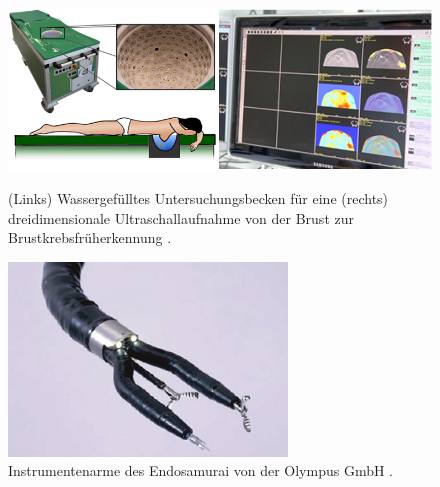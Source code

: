 

\begin{figure}[!htb]
		\includegraphics[width=\linewidth]{Content/Pictures/us.png}
		\caption{(Links) Wassergefülltes Untersuchungsbecken für eine (rechts) dreidimensionale Ultraschallaufnahme von der Brust zur Brustkrebsfrüherkennung \cite{Ultraschall}.} 
		\label{fig:us}
	\endminipage\hfill
		\includegraphics[width=\linewidth]{Content/Pictures/endo.png}
		\caption{Instrumentenarme des Endosamurai von der Olympus GmbH \cite{EndosamuraiBild}.} 
		\label{fig:endosamurai}
	\endminipage
\end{figure}

